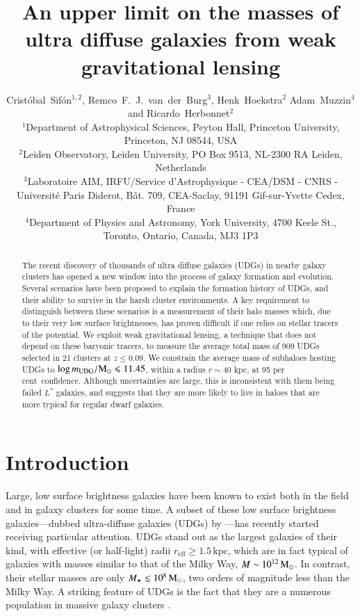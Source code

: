 \documentclass[usenatbib,fleqn]{mnras}
\title[Weak lensing masses of UDGs]{An upper limit on the masses of ultra diffuse galaxies from weak gravitational lensing}
\author[C.\ Sif\'on, R.\ F.\ J.\ van der Burg, H.\ Hoekstra, A.\ Muzzin \& R.\ Herbonnet]
  {
      Crist\'obal~Sif\'on$^{1,2}$,
      Remco~F.~J.~van~der~Burg$^3$,
      Henk~Hoekstra$^2$
      Adam~Muzzin$^4$
      and
      \newauthor
      Ricardo~Herbonnet$^2$
\\
      $^1$Department of Astrophysical Sciences, Peyton Hall, Princeton University, Princeton, NJ 08544, USA\\
      $^2$Leiden Observatory, Leiden University, PO Box 9513, NL-2300 RA Leiden, Netherlands\\
      $^3$Laboratoire AIM, IRFU/Service d'Astrophysique - CEA/DSM - CNRS - Universit\'e Paris Diderot, B\^at. 709, CEA-Saclay, 91191 Gif-sur-Yvette Cedex, France\\
      $^4$Department of Physics and Astronomy, York University, 4700 Keele St., Toronto, Ontario, Canada, MJ3 1P3
  }
\def\percent{ per cent}
\def\reff{r_\mathrm{eff}}
\begin{document}
\label{firstpage}
\pagerange{\pageref{firstpage}--\pageref{lastpage}}

\maketitle

\begin{abstract}
        The recent discovery of thousands of ultra diffuse galaxies (UDGs) in nearby galaxy clusters has opened a new window into the process of galaxy formation and evolution. Several scenarios have been proposed to explain the formation history of UDGs, and their ability to survive in the harsh cluster environments. A key requirement to distinguish between these scenarios is a measurement of their halo masses which, due to their very low surface brightnesses, has proven difficult if one relies on stellar tracers of the potential. We exploit weak gravitational lensing, a technique that does not depend on these baryonic tracers, to measure the average total mass of 909 UDGs selected in 21 clusters at $z\leq0.09$. We constrain the average mass of subhaloes hosting UDGs to $\log m_{\rm UDG}/\mathrm{M}_\odot\leqslant11.45$, within a radius $r\sim40$ kpc, at 95\percent\ confidence. Although uncertainties are large, this is inconsistent with them being failed $L^*$ galaxies, and suggests that they are more likely to live in haloes that are more typical for regular dwarf galaxies.
\end{abstract}

\section{Introduction}
\label{s:intro}

Large, low surface brightness galaxies have been known to exist both in the field \citep{dalcanton97} and in galaxy clusters \citep{impey88,turner93} for some time.
A subset of these low surface brightness galaxies---dubbed ultra-diffuse galaxies (UDGs) by \cite{vandokkum15_coma}---has recently started receiving particular attention. UDGs stand out as the largest galaxies of their kind, with effective (or half-light) radii $\reff\geq1.5\,\mathrm{kpc}$, which are in fact typical of galaxies with masses similar to that of the Milky Way, $M\sim10^{12}\,\mathrm{M}_\odot$. In contrast, their stellar masses are only $M_\star\lesssim10^8\,\mathrm{M}_\odot$, two orders of magnitude less than the Milky Way. A striking feature of UDGs is the fact that they are a numerous population in massive galaxy clusters \citep{vandokkum15_coma,koda15,mihos15,yagi16,vdburg16}.
\end{document}
